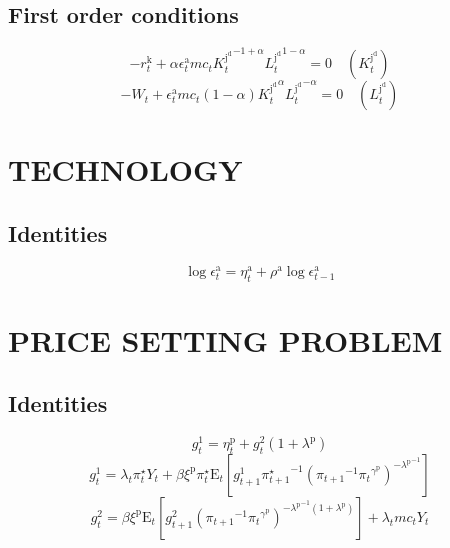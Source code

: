 \subsection{First order conditions}

\begin{equation}
-r^{\mathrm{k}}_{t} + {\alpha} {\epsilon^{\mathrm{a}}_{t}} {{m\!c}_{t}} {{K^{\mathrm{j}^{\mathrm{d}}}_{t}}^{-1 + \alpha}} {{L^{\mathrm{j}^{\mathrm{d}}}_{t}}^{1 - \alpha}} = 0
 \quad \left(K^{\mathrm{j}^{\mathrm{d}}}_{t}\right)
\end{equation}
\begin{equation}
-W_{t} + {\epsilon^{\mathrm{a}}_{t}} {{m\!c}_{t}} \left(1 - \alpha\right) {{K^{\mathrm{j}^{\mathrm{d}}}_{t}}^{\alpha}} {{L^{\mathrm{j}^{\mathrm{d}}}_{t}}^{-\alpha}} = 0
 \quad \left(L^{\mathrm{j}^{\mathrm{d}}}_{t}\right)
\end{equation}




\section{TECHNOLOGY}

\subsection{Identities}

\begin{equation}
\log{\epsilon^{\mathrm{a}}_{t}} = \eta^{\mathrm{a}}_{t} + {\rho^{\mathrm{a}}} {\log{\epsilon^{\mathrm{a}}_{t-1}}}
\end{equation}




\section{PRICE SETTING PROBLEM}

\subsection{Identities}

\begin{equation}
g^{\mathrm{1}}_{t} = \eta^{\mathrm{p}}_{t} + {g^{\mathrm{2}}_{t}} \left(1 + \lambda^{\mathrm{p}}\right)
\end{equation}
\begin{equation}
g^{\mathrm{1}}_{t} = {\lambda_{t}} {\pi^{\star}_{t}} {Y_{t}} + {\beta} {\xi^{\mathrm{p}}} {\pi^{\star}_{t}} {\mathrm{E}_{t}\left[{g^{\mathrm{1}}_{t+1}} {\pi^{\star}_{t+1}}^{-1} {\left({\pi_{t+1}}^{-1} {{\pi_{t}}^{\gamma^{\mathrm{p}}}}\right)^{-{\lambda^{\mathrm{p}}}^{-1}}}\right]}
\end{equation}
\begin{equation}
g^{\mathrm{2}}_{t} = {\beta} {\xi^{\mathrm{p}}} {\mathrm{E}_{t}\left[{g^{\mathrm{2}}_{t+1}} {\left({\pi_{t+1}}^{-1} {{\pi_{t}}^{\gamma^{\mathrm{p}}}}\right)^{-{\lambda^{\mathrm{p}}}^{-1} \left(1 + \lambda^{\mathrm{p}}\right)}}\right]} + {\lambda_{t}} {{m\!c}_{t}} {Y_{t}}
\end{equation}




